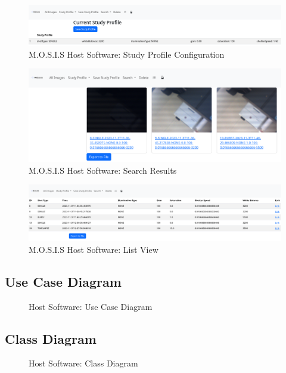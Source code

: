 \documentclass[12pt]{article}
\begin{document}
\begin{figure}[H]
	\includegraphics[width=\textwidth]{Figures/study_profile_save.png}
	\caption{M.O.S.I.S Host Software: Study Profile Configuration}
\end{figure}
\begin{figure}[H]
	\includegraphics[width=\textwidth]{Figures/search_results.png}
	\caption{M.O.S.I.S Host Software: Search Results}
\end{figure}
\begin{figure}[H]
	\includegraphics[width=\textwidth]{Figures/list_view.png}
	\caption{M.O.S.I.S Host Software: List View}
\end{figure}
\subsection{Use Case Diagram}
\begin{figure}[H]
	\caption{Host Software: Use Case Diagram}
\end{figure}
\subsection{Class Diagram}
\begin{figure}[H]
	\caption{Host Software: Class Diagram}
\end{figure}
\end{document}

